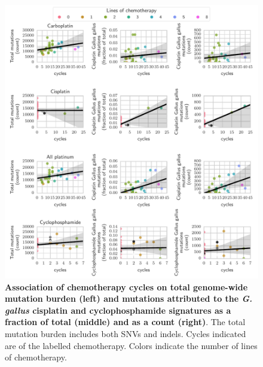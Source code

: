 \documentclass{article}
\begin{document}
\begin{figure}
\centering
\includegraphics[scale=1.0]{../figures/chemo_cycles_and_mutations.pdf}
\caption{\textbf{Association of chemotherapy cycles on total genome-wide mutation burden (left) and mutations attributed to the \textit{G. gallus} cisplatin and cyclophosphamide signatures as a fraction of total (middle) and as a count (right)}. The total mutation burden includes both SNVs and indels. Cycles indicated are of the labelled chemotherapy. Colors indicate the number of lines of chemotherapy.}
\label{fig:supp_chemo_cycles_and_mutations}
\end{figure}
\end{document}
